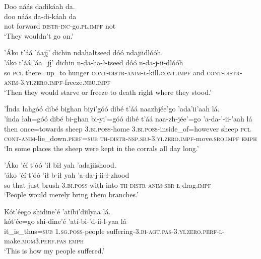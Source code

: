 \ea\label{ex:text9-14-4}
Doo náás dadikáah da.\\
\gll doo	náás	da-di-káah	da\\
     not	forward	\textsc{distr}-\textsc{inc}-go.\textsc{pl}.\textsc{impf}	not\\
\glt `They wouldn't go on.'
\z

\ea\label{ex:text9-14-5}
’Áko t’áá ’áajį’ dichin ndahałtseed dóó ndajiidlóóh.\\
\gll ’áko	t’áá	’áa=jį’	dichin	n-da-ha-ł-tseed	dóó	n-da-j-ii-dlóóh\\
     so	\textsc{pcl}	there=up\_to	hunger	\textsc{cont}-\textsc{distr}-\textsc{anim}-\textsc{ł}-kill.\textsc{cont}.\textsc{impf}	and	\textsc{cont}-\textsc{distr}-\textsc{anim}-3.\textsc{yi}.\textsc{zero}.\textsc{impf}-freeze.\textsc{neu}.\textsc{impf}\\
\glt `Then they would starve or freeze to death right where they stood.'
\z

\ea\label{ex:text9-14-6}
’Índa łahgóó dibé bighan biyi’góó dibé t’áá naazhjée’go ’ada’ii’aah lá.\\
\gll ’índa	łah=góó	dibé	bi-ghan	bi-yi’=góó	dibé	t’áá	naa-zh-jée’=go	’a-da-’-ii-’aah	lá\\
     then	once=towards	sheep	3.\textsc{bi}.\textsc{poss}-home	3.\textsc{bi}.\textsc{poss}-inside\_of=however	sheep	\textsc{pcl}	\textsc{cont}-\textsc{anim}-lie\_down.\textsc{perf}=\textsc{sub}	\textsc{th}-\textsc{distr}-\textsc{nsp}.\textsc{sbj}-3.\textsc{yi}.\textsc{zero}.\textsc{impf}-move.\textsc{sro}.\textsc{impf}	\textsc{emph}\\
\glt `In some places the sheep were kept in the corrals all day long.'
\z

\ea\label{ex:text9-14-7}
’Áko ’éí t’óó ’ił bił yah ’adajiishood.\\
\gll ’áko	’éí	t’óó	’ił	b-ił	yah	’a-da-j-ii-ł-zhood\\
     so	that	just	brush	3.\textsc{bi}.\textsc{poss}-with	into	\textsc{th}-\textsc{distr}-\textsc{anim}-\textsc{ser}-\textsc{ł}-drag.\textsc{impf}\\
\glt `People would merely bring them branches.'
\z

\ea\label{ex:text9-14-8}
Kót’éego shidine’é ’atíbi’diilyaa lá.\\
\gll kót’ée=go	shi-dine’é	’atí-bi-’d-ii-l-yaa	lá\\
     it\_is\_thus=\textsc{sub}	1.\textsc{sg}.\textsc{poss}-people	suffering-3.\textsc{bi}-\textsc{agt}.\textsc{pas}-3.\textsc{yi}.\textsc{zero}.\textsc{perf}-\textsc{l}-make.\textsc{mom}3.\textsc{perf}.\textsc{pas}	\textsc{emph}\\
\glt `This is how my people suffered.'
\z


